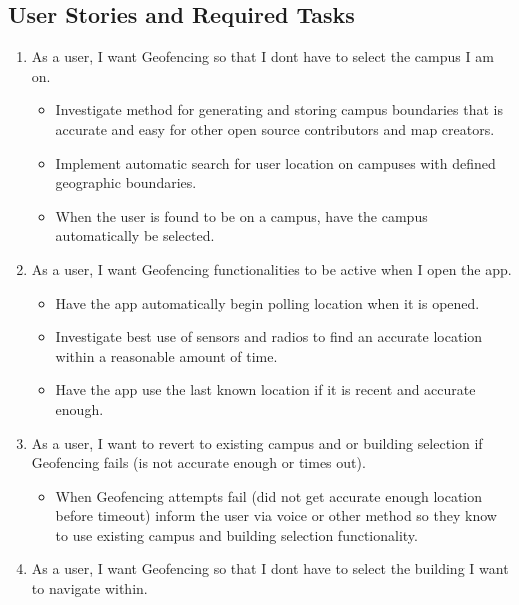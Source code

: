 \documentclass{scrreprt}
\begin{document}
\subsection{User Stories and Required Tasks}
\begin{enumerate}
	\item As a user, I want Geofencing so that I don\textsc{}t have to select the campus I am on.
	
		\begin{itemize}
			\item Investigate method for generating and storing campus boundaries that is accurate and easy for other open source contributors and map creators.
			\item Implement automatic search for user location on campuses with defined geographic boundaries.
			\item When the user is found to be on a campus, have the campus automatically be selected.
		\end{itemize}
		
	\item As a user, I want Geofencing functionalities to be active when I open the app.
	
		\begin{itemize}
			\item Have the app automatically begin polling location when it is opened.
			\item Investigate best use of sensors and radios to find an accurate location within a reasonable amount of time.
			\item Have the app use the last known location if it is recent and accurate enough.
		\end{itemize}
		
	\item As a user, I want to revert to existing campus and or building selection if Geofencing fails (is not accurate enough or times out).
	
		\begin{itemize}
			\item When Geofencing attempts fail (did not get accurate enough location before timeout) inform the user via voice or other method so they know to use existing campus and building selection functionality.
		\end{itemize}
		
	\item As a user, I want Geofencing so that I don\textsc{}t have to select the building I want to navigate within.
		\begin{itemize}
		

\end{itemize}
\end{enumerate}
\end{document}
